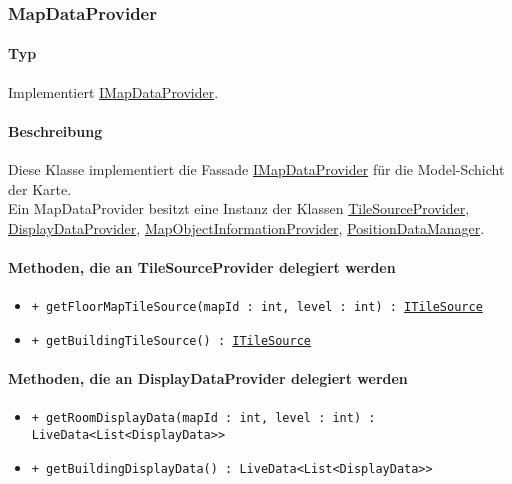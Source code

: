 \subsubsection{MapDataProvider}\label{App_Map_Model_MapDataProvider}
\paragraph*{Typ}
Implementiert \hyperref[App_Map_Model_IMapDataProvider]{IMapDataProvider}.
\paragraph*{Beschreibung}
Diese Klasse implementiert die Fassade \hyperref[App_Map_Model_IMapDataProvider]{IMapDataProvider} für die Model-Schicht der Karte.\\
Ein MapDataProvider besitzt eine Instanz der Klassen 
\hyperref[App_Map_Model_TileSourceProvider]{TileSourceProvider}, \hyperref[App_Map_Model_DisplayDataProvider]{DisplayDataProvider}, \hyperref[App_Map_Model_MapObjectInformationProvider]{MapObjectInformationProvider}, \hyperref[App_Map_Model_PositionDataManager]{PositionDataManager}.

\paragraph*{Methoden, die an TileSourceProvider delegiert werden}
\begin{itemize}
    \item \texttt{+ getFloorMapTileSource(mapId : int, level : int) : \href{https://osmdroid.github.io/osmdroid/javadocAll/org/osmdroid/tileprovider/tilesource/ITileSource.html}{ITileSource}}
    \item \texttt{+ getBuildingTileSource() : \href{https://osmdroid.github.io/osmdroid/javadocAll/org/osmdroid/tileprovider/tilesource/ITileSource.html}{ITileSource}}
\end{itemize}

\paragraph*{Methoden, die an DisplayDataProvider delegiert werden}
\begin{itemize}
    \item \texttt{+ getRoomDisplayData(mapId : int, level : int) : LiveData<List<DisplayData>>}
    \item \texttt{+ getBuildingDisplayData() : LiveData<List<DisplayData>>}
\end{itemize}

